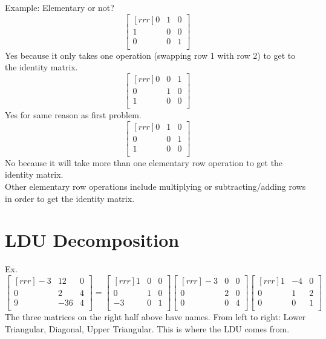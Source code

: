 \documentclass{report}
\theoremstyle{plain}
\theoremstyle{definition}
\theoremstyle{plain}
\begin{document}
Example: Elementary or not?\\
\[
\begin{bmatrix}[rrr] 0 & 1 & 0\\ 1 & 0 & 0\\ 0 & 0 & 1\\ \end{bmatrix}
\]
Yes because it only takes one operation (swapping row 1 with row 2) to get to the identity matrix.
\[
\begin{bmatrix}[rrr] 0 & 0 & 1\\ 0 & 1 & 0\\ 1 & 0 & 0\\ \end{bmatrix}
\]
Yes for same reason as first problem.
\[ 
\begin{bmatrix}[rrr] 0 & 1 & 0\\ 0 & 0 & 1\\ 1 & 0 & 0\\ \end{bmatrix}
\]
No because it will take more than one elementary row operation to get the identity matrix.\\
Other elementary row operations include multiplying or subtracting/adding rows in order to get the identity matrix.\\
\section{LDU Decomposition}

Ex.\\
\[
\begin{bmatrix}[rrr]
-3 & 12 & 0\\
0 & 2 & 4\\
9 & -36 & 4\\
\end{bmatrix}
=
\begin{bmatrix}[rrr]
1 & 0 & 0\\
0 & 1 & 0\\
-3 & 0 & 1\\
\end{bmatrix}
\begin{bmatrix}[rrr]
-3 & 0 & 0\\
0 & 2 & 0\\
0 & 0 & 4\\
\end{bmatrix}
\begin{bmatrix}[rrr]
1 & -4 & 0\\
0 & 1 & 2\\
0 & 0 & 1\\
\end{bmatrix}
\]
The three matrices on the right half above have names. From left to right: Lower Triangular, Diagonal, Upper Triangular. This is where the LDU comes from.\\
\end{document}
